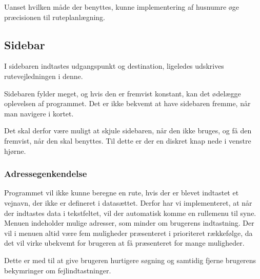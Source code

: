 Uanset hvilken måde der benyttes, kunne implementering af husnumre øge præcisionen til ruteplanlægning. 

\subsection{Sidebar}

I sidebaren indtastes udgangspunkt og destination, ligeledes udskrives rutevejledningen i denne. 

Sidebaren fylder meget, og hvis den er fremvist konstant, kan det ødelægge oplevelsen af programmet. Det er ikke bekvemt at have sidebaren fremme, når man navigere i kortet. 

Det skal derfor være muligt at skjule sidebaren, når den ikke bruges, og få den fremvist, når den skal benyttes. Til dette er der en diskret knap nede i venstre hjørne.

\subsubsection{Adressegenkendelse}

Programmet vil ikke kunne beregne en rute, hvis der er blevet indtastet et vejnavn, der ikke er defineret i datasættet. Derfor har vi implementeret, at når der indtastes data i tekstfeltet, vil der automatisk komme en rullemenu til syne. Menuen indeholder mulige adresser, som minder om brugerens indtastning. Der vil i menuen altid være fem muligheder præsenteret i prioriteret rækkefølge, da det vil virke ubekvemt for brugeren at få præsenteret for mange muligheder.

Dette er med til at give brugeren hurtigere søgning og samtidig fjerne brugerens bekymringer om fejlindtastninger.

